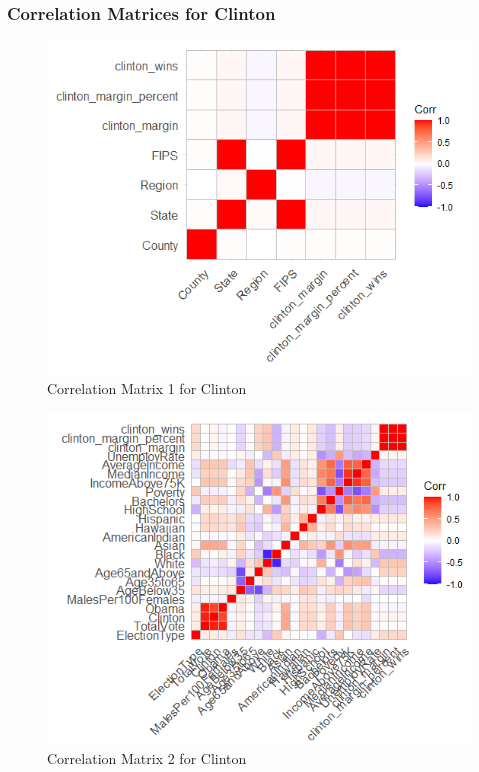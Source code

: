 \documentclass[11pt]{article}
\begin{document}
\subsubsection{Correlation Matrices for Clinton}
\begin{figure}[H]
    \centering
    \includegraphics[width=0.90\columnwidth]{assets/cc1.PNG}
    \caption{Correlation Matrix 1 for Clinton}
    \label{lr}
\end{figure}

\begin{figure}[H]
    \centering
    \includegraphics[width=0.90\columnwidth]{assets/cc2.PNG}
    \caption{Correlation Matrix 2 for Clinton}
    \label{lr}
\end{figure}
\end{document}
